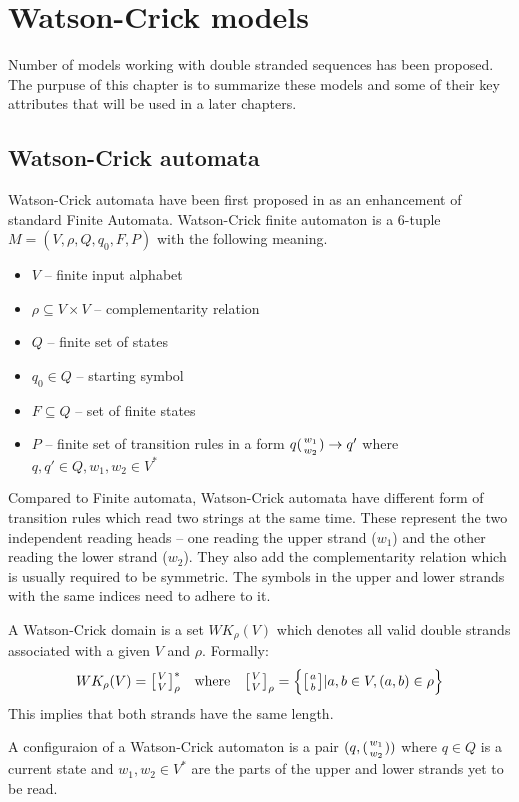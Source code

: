 \chapter{Watson-Crick models}
Number of models working with double stranded sequences has been proposed. The purpuse of this chapter is to summarize these models and some of their key attributes that will be used in a later chapters.


\section{Watson-Crick automata}
Watson-Crick automata have been first proposed in \cite{WK_FIN_AUT} as an enhancement of standard Finite Automata. Watson-Crick finite automaton is a 6-tuple $M = (V, \rho, Q, q_0, F, P)$ with the following meaning.
\begin{itemize}
  \item{$V$ -- finite input alphabet}
  \item{$\rho \subseteq V \times V$ -- complementarity relation}
  \item{$Q$ -- finite set of states}
  \item{$q_0 \in Q$ -- starting symbol}
  \item{$F \subseteq Q$ -- set of finite states}
  \item{$P$ -- finite set of transition rules in a form $q({w_1 \atop w_2}) \rightarrow q'$ where $q, q' \in Q, w_1, w_2 \in V^*$}
\end{itemize}

Compared to Finite automata, Watson-Crick automata have different form of transition rules which read two strings at the same time. These represent the two independent reading heads -- one reading the upper strand ($w_1$) and the other reading the lower strand ($w_2$). They also add the complementarity relation which is usually required to be symmetric. The symbols in the upper and lower strands with the same indices need to adhere to it.

A Watson-Crick domain is a set $WK_{\rho}(V)$ which denotes all valid double strands associated with a given $V$ and $\rho$. Formally:
\begin{align}
	WK_{\rho}(V) = \wkdomain{V}{V}_{\rho}^{*} && \textnormal{where} && \wkdomain{V}{V}_{\rho} = \Big\{\wkdomain{a}{b} | a, b \in V, (a, b) \in \rho \Big\}
\end{align}
This implies that both strands have the same length.

A configuraion of a Watson-Crick automaton is a pair $(q, ({w_1 \atop w_2}))$ where $q \in Q$ is a current state and $w_1, w_2 \in V^*$ are the parts of the upper and lower strands yet to be read.


